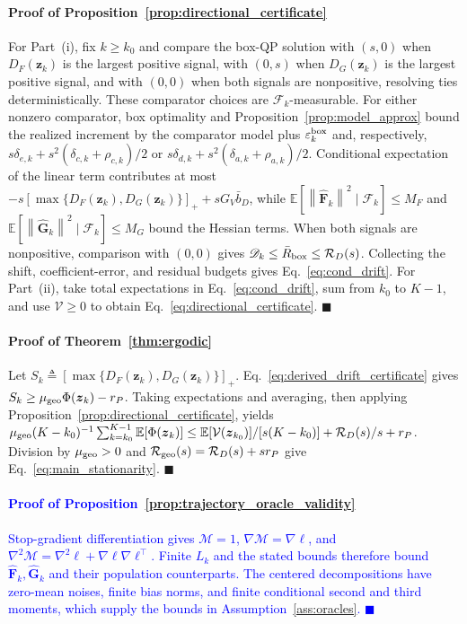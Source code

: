 \documentclass[journal]{IEEEtran}
\theoremstyle{remark}
\newcommand{\E}{\mathbb{E}}
\newcommand{\norm}[1]{\left\lVert #1\right\rVert}
\newcommand{\bz}{\boldsymbol{z}}
\newcommand{\hatF}{\widehat{\boldsymbol{F}}}
\newcommand{\hatG}{\widehat{\boldsymbol{G}}}
\newcommand{\Vk}{\mathcal{V}}
\begin{document}
	\paragraph{Proof of Proposition~\ref{prop:directional_certificate}}\label{app:directional_certificate}
	For Part~(i), fix $k\ge k_0$ and compare the box-QP solution with $(s,0)$ when $D_F(\bz_k)$ is the largest positive signal, with $(0,s)$ when $D_G(\bz_k)$ is the largest positive signal, and with $(0,0)$ when both signals are nonpositive, resolving ties deterministically.
	These comparator choices are $\mathscr F_k$-measurable.
	For either nonzero comparator, box optimality and Proposition~\ref{prop:model_approx} bound the realized increment by the comparator model plus $\varepsilon_k^{\rm box}$ and, respectively, $s\delta_{e,k}+s^2(\delta_{c,k}+\rho_{c,k})/2$ or $s\delta_{d,k}+s^2(\delta_{a,k}+\rho_{a,k})/2$.
	Conditional expectation of the linear term contributes at most $-s[\max\{D_F(\bz_k),D_G(\bz_k)\}]_++sG_V\bar b_D$, while $\E[\norm{\hatF_k}^2\mid\mathscr F_k]\le M_F$ and $\E[\norm{\hatG_k}^2\mid\mathscr F_k]\le M_G$ bound the Hessian terms.
	When both signals are nonpositive, comparison with $(0,0)$ gives $\mathscr D_k\le\bar R_{\rm box}\le\mathcal R_D(s)$.
	Collecting the shift, coefficient-error, and residual budgets gives Eq.~\eqref{eq:cond_drift}.
	For Part~(ii), take total expectations in Eq.~\eqref{eq:cond_drift}, sum from $k_0$ to $K-1$, and use $\Vk\ge0$ to obtain Eq.~\eqref{eq:directional_certificate}.
	\hfill$\blacksquare$
	
	\paragraph{Proof of Theorem~\ref{thm:ergodic}}\label{app:ergodic}
	Let $S_k\triangleq[\max\{D_F(\bz_k),D_G(\bz_k)\}]_+$.
	Eq.~\eqref{eq:derived_drift_certificate} gives $S_k\ge\mu_{\rm geo}\Phi(\bz_k)-r_P$.
	Taking expectations and averaging, then applying Proposition~\ref{prop:directional_certificate}, yields $\mu_{\rm geo}(K-k_0)^{-1}\sum_{k=k_0}^{K-1}\E[\Phi(\bz_k)]\le \E[\Vk(\bz_{k_0})]/[s(K-k_0)]+\mathcal R_D(s)/s+r_P$.
	Division by $\mu_{\rm geo}>0$ and $\mathcal R_{\rm geo}(s)=\mathcal R_D(s)+sr_P$ give Eq.~\eqref{eq:main_stationarity}.
	\hfill$\blacksquare$

	\paragraph{\textcolor{blue}{Proof of Proposition~\ref{prop:trajectory_oracle_validity}}}\label{app:trajectory_oracle_validity}
	\textcolor{blue}{Stop-gradient differentiation gives $\mathcal M=1$, $\nabla\mathcal M=\nabla\ell$, and $\nabla^2\mathcal M=\nabla^2\ell+\nabla\ell\nabla\ell^{\top}$. Finite $L_k$ and the stated bounds therefore bound $\hatF_k,\hatG_k$ and their population counterparts. The centered decompositions have zero-mean noises, finite bias norms, and finite conditional second and third moments, which supply the bounds in Assumption~\ref{ass:oracles}.}
	\hfill\textcolor{blue}{$\blacksquare$}
	
\end{document}
